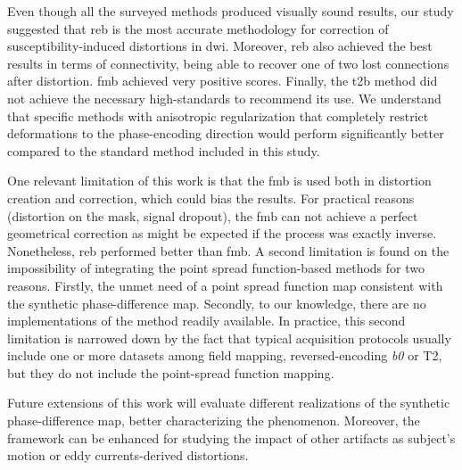 Even though all the surveyed methods produced visually 
sound results, our study suggested that \gls*{reb} is the 
most accurate methodology for correction of susceptibility-induced
distortions in \gls*{dwi}. Moreover, \gls*{reb} also achieved
the best results in terms of connectivity, being able to recover
one of two lost connections after distortion. \Gls*{fmb} achieved 
very positive scores. Finally, the \gls*{t2b} method did not achieve
the necessary high-standards to recommend its use. We understand
that specific methods with anisotropic regularization that completely
restrict deformations to the phase-encoding direction would perform
significantly better compared to the standard method included
in this study.


One relevant limitation of this work is that the \gls*{fmb} is
used both in distortion creation and correction, which could
bias the results. For practical reasons (distortion on the mask, 
signal dropout), the \gls*{fmb} can not achieve a perfect 
geometrical correction as might be
expected if the process was exactly inverse.
Nonetheless, \gls*{reb} performed better than \gls*{fmb}.
A second limitation is found on the impossibility of integrating the
point spread function-based methods for two reasons.
Firstly, the unmet need of a point spread function map consistent
with the synthetic phase-difference map. Secondly, to our knowledge,
there are no implementations of the method readily available.
In practice, this second limitation is narrowed down by the
fact that typical acquisition protocols usually include one or more
datasets among field mapping, reversed-encoding \textit{b0} or T2,
but they do not include the point-spread function mapping.

Future extensions of this work will evaluate
different realizations of the synthetic phase-difference map,
better characterizing the phenomenon. Moreover, the
framework can be enhanced for studying the impact of 
other artifacts as subject's motion or eddy 
currents-derived distortions.